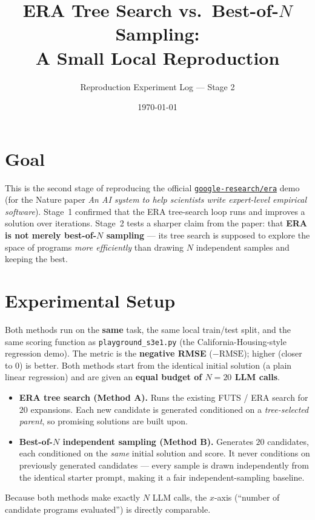 \documentclass[11pt]{article}
\title{ERA Tree Search vs.\ Best-of-$N$ Sampling:\\ A Small Local Reproduction}
\author{Reproduction Experiment Log --- Stage 2}
\date{\today}
\begin{document}
\maketitle

\section{Goal}
This is the second stage of reproducing the official
\href{https://github.com/google-research/era}{\texttt{google-research/era}} demo
(for the Nature paper \emph{An AI system to help scientists write expert-level
empirical software}). Stage~1 confirmed that the ERA tree-search loop runs and
improves a solution over iterations. Stage~2 tests a sharper claim from the
paper: that \textbf{ERA is not merely best-of-$N$ sampling} --- its tree search
is supposed to explore the space of programs \emph{more efficiently} than drawing
$N$ independent samples and keeping the best.

\section{Experimental Setup}
Both methods run on the \textbf{same} task, the same local train/test split, and
the same scoring function as \texttt{playground\_s3e1.py} (the
California-Housing-style regression demo). The metric is the
\textbf{negative RMSE} ($-\mathrm{RMSE}$); higher (closer to $0$) is better. Both
methods start from the identical initial solution (a plain linear regression) and
are given an \textbf{equal budget of $N=20$ LLM calls}.

\begin{itemize}
  \item \textbf{ERA tree search (Method A).} Runs the existing FUTS / ERA search
        for $20$ expansions. Each new candidate is generated conditioned on a
        \emph{tree-selected parent}, so promising solutions are built upon.
  \item \textbf{Best-of-$N$ independent sampling (Method B).} Generates $20$
        candidates, each conditioned on the \emph{same} initial solution and
        score. It never conditions on previously generated candidates --- every
        sample is drawn independently from the identical starter prompt, making
        it a fair independent-sampling baseline.
\end{itemize}

Because both methods make exactly $N$ LLM calls, the $x$-axis
(``number of candidate programs evaluated'') is directly comparable.
\end{document}
